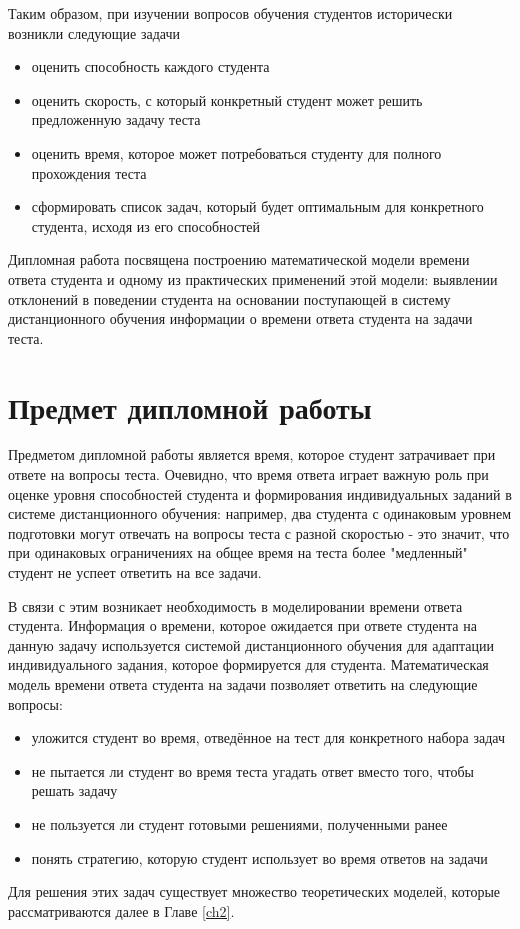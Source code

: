 Таким образом, при изучении вопросов обучения студентов исторически возникли следу\-ющие задачи
\begin{itemize}
\item оценить способность каждого студента
\item оценить скорость, с который конкретный студент может решить пред\-ложенную задачу теста
\item оценить время, которое может потребоваться студенту для полного про\-хождения теста
\item сформировать список задач, который будет оптимальным для конкрет\-ного студента, исходя из его способностей
\end{itemize}

Дипломная работа посвящена построению математической модели времени ответа студента и одному из практических применений этой модели: выявлении отклонений в поведении студента на основании поступающей в систему дистан\-ционного обучения информации о времени ответа студента на задачи теста.

\section{Предмет дипломной работы}

Предметом дипломной работы является время, которое студент затрачи\-вает при ответе на вопросы теста. Очевидно, что время ответа играет важную роль при оценке уровня способностей студента и формирования индивидуаль\-ных заданий в системе дистанционного обучения: например, два студента с одина\-ковым уровнем подготовки  могут отвечать на вопросы теста с разной скоростью - это значит, что при одинаковых ограничениях на общее время на теста более "медленный" студент не успеет ответить на все задачи.

В связи с этим возникает необходимость в моделировании времени ответа студента. Информация о времени, которое ожидается при ответе студента на данную задачу исполь\-зуется системой дистанционного обучения для адап\-тации индивидуального задания, кото\-рое формируется для студента. Матема\-тическая модель времени ответа студента на задачи позволяет ответить на следующие вопросы:
\begin{itemize}
\item уложится студент во время, отведённое на тест для конкретного набора задач
\item не пытается ли студент во время теста угадать ответ вместо того, чтобы решать задачу
\item не пользуется ли студент готовыми решениями, полученными ранее
\item понять стратегию, которую студент использует  во время ответов на задачи
\end{itemize}

Для решения этих задач существует множество теоретических моделей, которые\\ рассматриваются далее в Главе \ref{ch2}.
